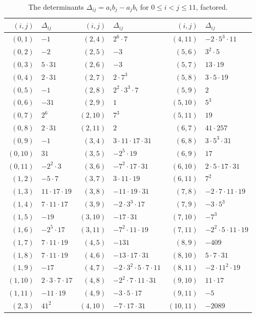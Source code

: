 \begin{table}[htbp]
\centering
\caption{The determinants $\Delta_{ij}=a_ib_j-a_jb_i$ for $0\le i<j\le 11$, factored.}\label{tab:r5-det}
\small
\begin{tabular}{rl@{\qquad}rl@{\qquad}rl}
\toprule
$(i,j)$ & $\Delta_{ij}$ & $(i,j)$ & $\Delta_{ij}$ & $(i,j)$ & $\Delta_{ij}$\\
\midrule
$(0,1)$ & $-1$ & $(2,4)$ & $2^{6}\cdot 7$ & $(4,11)$ & $-2\cdot 5^{3}\cdot 11$ \\
$(0,2)$ & $-2$ & $(2,5)$ & $-3$ & $(5,6)$ & $3^{2}\cdot 5$ \\
$(0,3)$ & $5\cdot 31$ & $(2,6)$ & $-3$ & $(5,7)$ & $13\cdot 19$ \\
$(0,4)$ & $2\cdot 31$ & $(2,7)$ & $2\cdot 7^{3}$ & $(5,8)$ & $3\cdot 5\cdot 19$ \\
$(0,5)$ & $-1$ & $(2,8)$ & $2^{2}\cdot 3^{3}\cdot 7$ & $(5,9)$ & $2$ \\
$(0,6)$ & $-31$ & $(2,9)$ & $1$ & $(5,10)$ & $5^{3}$ \\
$(0,7)$ & $2^{6}$ & $(2,10)$ & $7^{3}$ & $(5,11)$ & $19$ \\
$(0,8)$ & $2\cdot 31$ & $(2,11)$ & $2$ & $(6,7)$ & $41\cdot 257$ \\
$(0,9)$ & $-1$ & $(3,4)$ & $3\cdot 11\cdot 17\cdot 31$ & $(6,8)$ & $3\cdot 5^{3}\cdot 31$ \\
$(0,10)$ & $31$ & $(3,5)$ & $-2^{5}\cdot 19$ & $(6,9)$ & $17$ \\
$(0,11)$ & $-2^{2}\cdot 3$ & $(3,6)$ & $-7^{2}\cdot 17\cdot 31$ & $(6,10)$ & $2\cdot 5\cdot 17\cdot 31$ \\
$(1,2)$ & $-5\cdot 7$ & $(3,7)$ & $3\cdot 11\cdot 19$ & $(6,11)$ & $7^{2}$ \\
$(1,3)$ & $11\cdot 17\cdot 19$ & $(3,8)$ & $-11\cdot 19\cdot 31$ & $(7,8)$ & $-2\cdot 7\cdot 11\cdot 19$ \\
$(1,4)$ & $7\cdot 11\cdot 17$ & $(3,9)$ & $-2\cdot 3^{3}\cdot 17$ & $(7,9)$ & $-3\cdot 5^{3}$ \\
$(1,5)$ & $-19$ & $(3,10)$ & $-17\cdot 31$ & $(7,10)$ & $-7^{3}$ \\
$(1,6)$ & $-2^{5}\cdot 17$ & $(3,11)$ & $-7^{2}\cdot 11\cdot 19$ & $(7,11)$ & $-2^{2}\cdot 5\cdot 11\cdot 19$ \\
$(1,7)$ & $7\cdot 11\cdot 19$ & $(4,5)$ & $-131$ & $(8,9)$ & $-409$ \\
$(1,8)$ & $7\cdot 11\cdot 19$ & $(4,6)$ & $-13\cdot 17\cdot 31$ & $(8,10)$ & $5\cdot 7\cdot 31$ \\
$(1,9)$ & $-17$ & $(4,7)$ & $-2\cdot 3^{2}\cdot 5\cdot 7\cdot 11$ & $(8,11)$ & $-2\cdot 11^{2}\cdot 19$ \\
$(1,10)$ & $2\cdot 3\cdot 7\cdot 17$ & $(4,8)$ & $-2^{2}\cdot 7\cdot 11\cdot 31$ & $(9,10)$ & $11\cdot 17$ \\
$(1,11)$ & $-11\cdot 19$ & $(4,9)$ & $-3\cdot 5\cdot 17$ & $(9,11)$ & $-5$ \\
$(2,3)$ & $41^{2}$ & $(4,10)$ & $-7\cdot 17\cdot 31$ & $(10,11)$ & $-2089$ \\
\bottomrule
\end{tabular}
\end{table}

